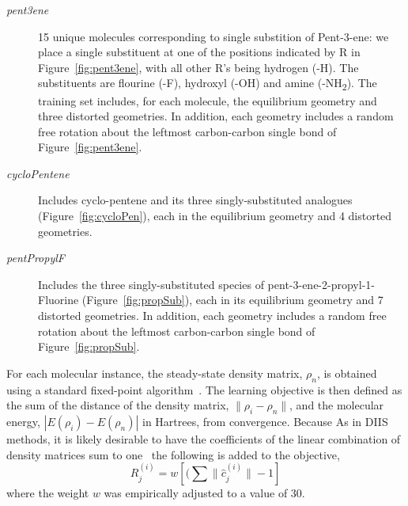 \documentclass[twoside,11pt]{article}
\begin{document}
\begin{description}
\item[\textit{pent3ene}] 15 unique molecules corresponding to single substition of Pent-3-ene: we place a single substituent at one of the positions indicated by R in Figure~\ref{fig:pent3ene}, with all other R's being hydrogen (-H). The substituents are flourine (-F), hydroxyl (-OH) and amine (-NH\textsubscript{2}). The training set includes, for each molecule, the equilibrium geometry and three distorted geometries. In addition, each geometry includes a random free rotation about the leftmost carbon-carbon single bond of Figure~\ref{fig:pent3ene}. 
\item[\textit{cycloPentene}]Includes cyclo-pentene and its three singly-substituted analogues (Figure~\ref{fig:cycloPen}), each in the equilibrium geometry and 4 distorted geometries. 
\item[\textit{pentPropylF}] Includes the three singly-substituted species of pent-3-ene-2-propyl-1-Fluorine (Figure~\ref{fig:propSub}), each in its equilibrium geometry and 7 distorted geometries. In addition, each geometry includes a random free rotation about the leftmost carbon-carbon single bond of Figure~\ref{fig:propSub}. 
\end{description}

For each molecular instance, the steady-state density matrix, $\rho_n$, is obtained using a standard fixed-point algorithm~\citep{Pulay1980}. The learning objective is then defined as the sum of the distance of the density matrix, $\|\rho_i-\rho_n\|$, and the molecular energy, $|E(\rho_i)-E(\rho_n)|$ in Hartrees, from convergence. Because As in DIIS methods, it is likely desirable to have the coefficients of the linear combination of density matrices sum to one~\cite{scusceria} the following is added to the objective,
\begin{equation}
R^{(i)}_j =  w [(\sum \|\hat{c}^{(i)}_j\| - 1]
\end{equation}
where the weight $w$ was empirically adjusted to a value of 30. 
\end{document}

